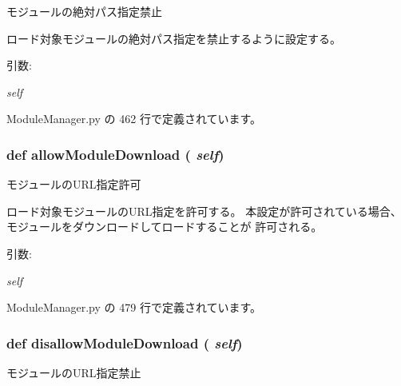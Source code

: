 モジュールの絶対パス指定禁止 

ロード対象モジュールの絶対パス指定を禁止するように設定する。

\begin{Desc}
\item[引数:]
\begin{description}
\item[{\em self}]\end{description}
\end{Desc}


 ModuleManager.py の 462 行で定義されています。
\subsubsection{\setlength{\rightskip}{0pt plus 5cm}def allowModuleDownload ( {\em self})}\label{classsource__py_1_1_module_manager_1_1_module_manager_fbe80e0d6e6af5c79a41f2dd252b9786}


モジュールのURL指定許可 

ロード対象モジュールのURL指定を許可する。 本設定が許可されている場合、モジュールをダウンロードしてロードすることが 許可される。

\begin{Desc}
\item[引数:]
\begin{description}
\item[{\em self}]\end{description}
\end{Desc}


 ModuleManager.py の 479 行で定義されています。
\subsubsection{\setlength{\rightskip}{0pt plus 5cm}def disallowModuleDownload ( {\em self})}\label{classsource__py_1_1_module_manager_1_1_module_manager_0731a391af50a69eea9eb738a9d22383}


モジュールのURL指定禁止 

